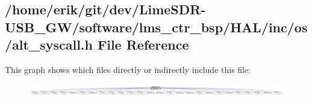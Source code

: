 \subsection{/home/erik/git/dev/\+Lime\+S\+D\+R-\/\+U\+S\+B\+\_\+\+G\+W/software/lms\+\_\+ctr\+\_\+bsp/\+H\+A\+L/inc/os/alt\+\_\+syscall.h File Reference}
\label{alt__syscall_8h}
This graph shows which files directly or indirectly include this file\+:
\nopagebreak
\begin{figure}[H]
\begin{center}
\leavevmode
\includegraphics[width=350pt]{dd/d5c/alt__syscall_8h__dep__incl}
\end{center}
\end{figure}

